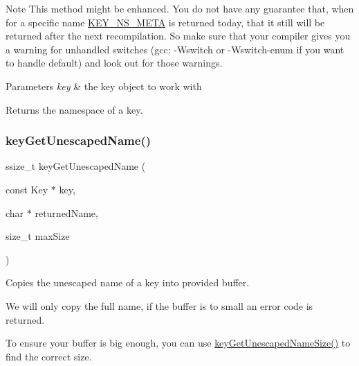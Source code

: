  \begin{DoxyNote}{Note}
This method might be enhanced. You do not have any guarantee that, when for a specific name \hyperlink{group__key_ggaec3b8d6f430ae49b91bafe8a86310a68ac5fbf2c3a7ae79fa2d60c48ae3e72688}{K\+E\+Y\+\_\+\+N\+S\+\_\+\+M\+E\+TA} is returned today, that it still will be returned after the next recompilation. So make sure that your compiler gives you a warning for unhandled switches (gcc\+: -\/\+Wswitch or -\/\+Wswitch-\/enum if you want to handle default) and look out for those warnings.
\end{DoxyNote}

\begin{DoxyParams}{Parameters}
{\em key} & the key object to work with \\
\hline
\end{DoxyParams}
\begin{DoxyReturn}{Returns}
the namespace of a key. 
\end{DoxyReturn}
\mbox{\label{group__keyname_ga44a576c7919d5b03f28d3ed3afaa7cd1}} 
\subsubsection{\texorpdfstring{key\+Get\+Unescaped\+Name()}{keyGetUnescapedName()}}
{\footnotesize\ttfamily ssize\+\_\+t key\+Get\+Unescaped\+Name (\begin{DoxyParamCaption}\item[{const Key $\ast$}]{key,  }\item[{char $\ast$}]{returned\+Name,  }\item[{size\+\_\+t}]{max\+Size }\end{DoxyParamCaption})}



Copies the unescaped name of a key into provided buffer. 

We will only copy the full name, if the buffer is to small an error code is returned.

To ensure your buffer is big enough, you can use \hyperlink{group__keyname_ga5e7eff0c77678420199d0d2e8729152b}{key\+Get\+Unescaped\+Name\+Size()} to find the correct size.


